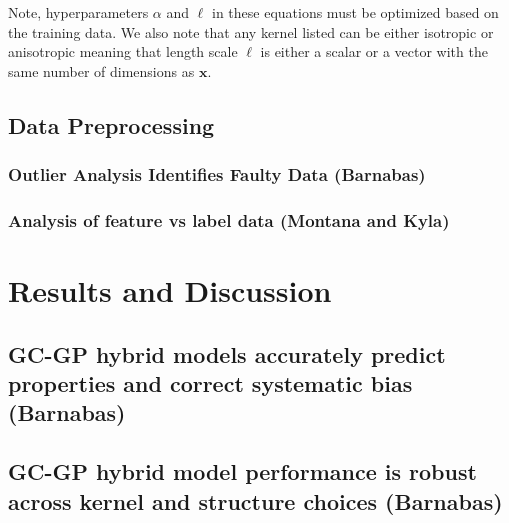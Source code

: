 \documentclass[journal=jacsat,manuscript=article]{achemso}
\begin{document}



Note, hyperparameters $\alpha$ and $\ell$ in these equations must be optimized based on the training data. We also note that any kernel listed can be either isotropic or anisotropic meaning that length scale $\ell$ is either a scalar or a vector with the same number of dimensions as $\mathbf{x}$.

\subsection{Data Preprocessing}

\subsubsection{Outlier Analysis Identifies Faulty Data (Barnabas)} 

\subsubsection{Analysis of feature vs label data (Montana and Kyla) }


\section{Results and Discussion}

\subsection{GC-GP hybrid models accurately predict properties and correct systematic bias (Barnabas)}

\subsection{GC-GP hybrid model performance is robust across kernel and structure choices (Barnabas) }


%
\end{document}
